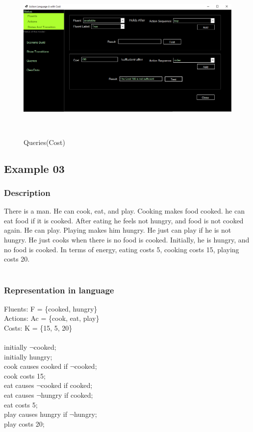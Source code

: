 \documentclass[11pt]{article}
\begin{document}
	\begin{figure}[H]
		\centering
		\includegraphics[width=6in,height=3in]{./testImages/Example2/img10.png}
		\label{Figure:f02.10}
		\caption{Queries(Cost)}
	\end{figure}

		

	\subsection{Example 03}
	\subsubsection{Description}\label{par:p103}
	There is a man. He can cook, eat, and play. Cooking makes food cooked. he can eat food if it is cooked. After eating he feels not hungry, and food is not cooked again. He can play. Playing makes him hungry. He just can play if he is not hungry. He just cooks when there is no food is cooked. Initially, he is hungry, and no food is cooked. In terms of energy, eating costs 5, cooking costs 15, playing costs 20.\\
	\\
	\subsubsection{Representation in language}\label{par:p203}
	Fluents: F = \{cooked, hungry\}\\
	Actions: Ac = \{cook, eat, play\}\\
	Costs: K = \{15, 5, 20\}
	\\
	\\
	initially $\neg$cooked;\\
	initially hungry;\\
	cook causes cooked if $\neg$cooked;\\
	cook costs 15;\\
	eat causes $\neg$cooked if cooked;\\
	eat causes $\neg$hungry if cooked;\\
	eat costs 5;\\
	play causes hungry if $\neg$hungry;\\
	play costs 20;\\
	\\
\end{document}
